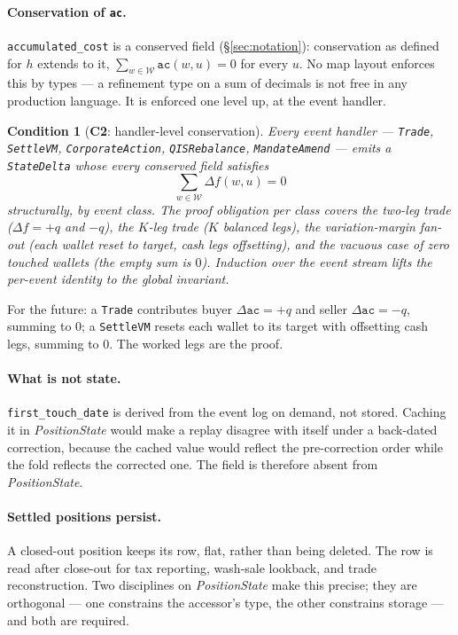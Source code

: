 \documentclass[11pt,a4paper]{article}
\newtheorem{condition}[definition]{Condition}
\begin{document}
\paragraph{Conservation of \texttt{ac}.}
\texttt{accumulated\_cost} is a conserved field (\S\ref{sec:notation}): conservation as
defined for $h$ extends to it, $\sum_{w\in\mathcal{W}}\texttt{ac}(w,u)=0$ for every $u$. No
map layout enforces this by types --- a refinement type on a sum of decimals is not free in
any production language. It is enforced one level up, at the event handler.

\begin{condition}[\textbf{C2}: handler-level conservation]
Every event handler --- \texttt{Trade}, \texttt{SettleVM}, \texttt{CorporateAction},
\texttt{QISRebalance}, \texttt{MandateAmend} --- emits a \texttt{StateDelta} whose every
conserved field satisfies
\[
\sum_{w\in\mathcal{W}} \Delta f(w,u) = 0
\]
structurally, by event class. The proof obligation per class covers the two-leg trade
($\Delta f = +q$ and $-q$), the $K$-leg trade ($K$ balanced legs), the variation-margin
fan-out (each wallet reset to target, cash legs offsetting), and the vacuous case of zero
touched wallets (the empty sum is $0$). Induction over the event stream lifts the per-event
identity to the global invariant.
\end{condition}

\noindent For the future: a \texttt{Trade} contributes buyer $\Delta\texttt{ac}=+q$ and
seller $\Delta\texttt{ac}=-q$, summing to $0$; a \texttt{SettleVM} resets each wallet to its
target with offsetting cash legs, summing to $0$. The worked legs are the proof.

\paragraph{What is not state.}
\texttt{first\_touch\_date} is derived from the event log on demand, not stored. Caching it
in \emph{PositionState} would make a replay disagree with itself under a back-dated
correction, because the cached value would reflect the pre-correction order while the fold
reflects the corrected one. The field is therefore absent from \emph{PositionState}.

\paragraph{Settled positions persist.}
A closed-out position keeps its row, flat, rather than being deleted. The row is read after
close-out for tax reporting, wash-sale lookback, and trade reconstruction. Two disciplines
on \emph{PositionState} make this precise; they are orthogonal --- one constrains the
accessor's type, the other constrains storage --- and both are required.
\end{document}

